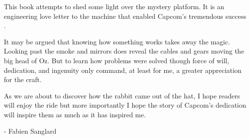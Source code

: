 This book attempts to shed some light over the mystery platform. It is an engineering love letter to the machine that enabled Capcom's tremendous success . 

It may be argued that knowing how something works takes away the magic. Looking past the smoke and mirrors does reveal the cables and gears moving the big head of Oz. But to learn how problems were solved though force of will, dedication, and ingenuity only command, at least for me, a greater appreciation for the craft.

As we are about to discover how the rabbit came out of the hat, I hope readers will enjoy the ride but more importantly I hope the story of Capcom's dedication will inspire them as much as it has inspired me. 

- Fabien Sanglard